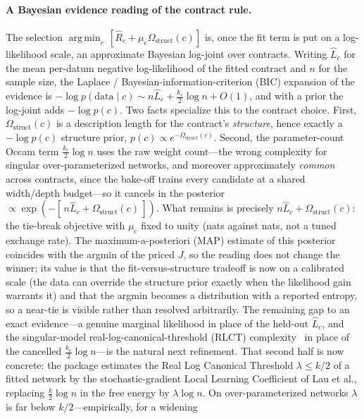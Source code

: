 \documentclass[11pt]{article}
\theoremstyle{definition}
\begin{document}
\paragraph{A Bayesian evidence reading of the contract rule.} The selection
$\operatorname*{arg\,min}_c\,[\widehat{R}_c+\mu_{\mathrm c}\Omega_{\mathrm{struct}}(c)]$ is, once the fit term is put on a
log-likelihood scale, an approximate Bayesian log-joint over contracts. Writing $\hat{L}_c$ for the mean
per-datum negative log-likelihood of the fitted contract and $n$ for the sample size, the Laplace / Bayesian-information-criterion (BIC)
expansion of the evidence is $-\log p(\mathrm{data}\mid c)\sim n\hat{L}_c+\tfrac{k_c}{2}\log n+O(1)$, and with
a prior the log-joint adds $-\log p(c)$. Two facts specialize this to the contract choice. First,
$\Omega_{\mathrm{struct}}(c)$ is a description length for the contract's \emph{structure}, hence exactly a
$-\log p(c)$ structure prior, $p(c)\propto e^{-\Omega_{\mathrm{struct}}(c)}$. Second, the parameter-count
Occam term $\tfrac{k_c}{2}\log n$ uses the raw weight count---the wrong complexity for singular
over-parameterized networks, and moreover approximately \emph{common} across contracts, since the bake-off
trains every candidate at a shared width/depth budget---so it cancels in the posterior
$\propto\exp(-[\,n\hat{L}_c+\Omega_{\mathrm{struct}}(c)\,])$. What remains is precisely
$n\hat{L}_c+\Omega_{\mathrm{struct}}(c)$: the tie-break objective with $\mu_{\mathrm c}$ fixed to unity
(nats against nats, not a tuned exchange rate). The maximum-a-posteriori (MAP) estimate of this posterior coincides with the argmin of the
priced $J$, so the reading does not change the winner; its value is that the fit-versus-structure tradeoff is
now on a calibrated scale (the data can override the structure prior exactly when the likelihood gain
warrants it) and that the argmin becomes a distribution with a reported entropy, so a near-tie is visible
rather than resolved arbitrarily. The remaining gap to an exact evidence---a genuine marginal likelihood in
place of the held-out $\hat{L}_c$, and the singular-model real-log-canonical-threshold (RLCT) complexity~\cite{watanabe2009slt,lau2023llc} in place of the cancelled
$\tfrac{k_c}{2}\log n$---is the natural next refinement. That second half is now concrete: the package
estimates the Real Log Canonical Threshold $\lambda\le k/2$ of a fitted network by the stochastic-gradient
Local Learning Coefficient of Lau et al., replacing $\tfrac{k}{2}\log n$ in the free energy by
$\lambda\log n$. On over-parameterized networks $\lambda$ is far below $k/2$---empirically, for a widening
\end{document}
